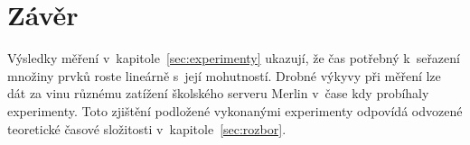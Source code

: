 \documentclass[11pt, a4paper, titlepage]{article}
\begin{document}

\section{Závěr}\label{sec:zaver}

Výsledky měření v~kapitole~\ref{sec:experimenty} ukazují, že čas potřebný k~seřazení množiny prvků roste lineárně s~její mohutností.
Drobné výkyvy při měření lze dát za vinu různému zatížení školského serveru Merlin v~čase kdy probíhaly experimenty.
Toto zjištění podložené vykonanými experimenty odpovídá odvozené teoretické časové složitosti v~kapitole~\ref{sec:rozbor}.

\end{document}
